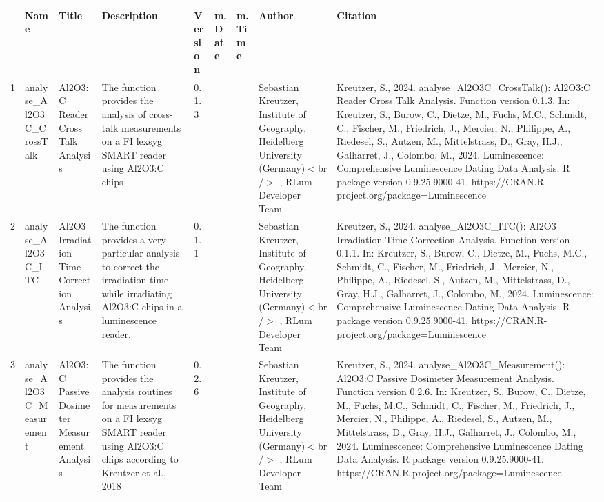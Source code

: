 \begin{table}[ht]
\centering
\begin{tabular}{rllllllll}
  \hline
 & Name & Title & Description & Version & m.Date & m.Time & Author & Citation \\ 
  \hline
1 & analyse\_Al2O3C\_CrossTalk & Al2O3:C Reader Cross Talk Analysis & The function provides the analysis of cross-talk measurements on a FI lexsyg SMART reader using Al2O3:C chips & 0.1.3
 &  &  & Sebastian Kreutzer, Institute of Geography, Heidelberg University (Germany)$<$br /$>$ , RLum Developer Team & Kreutzer, S., 2024. analyse\_Al2O3C\_CrossTalk(): Al2O3:C Reader Cross Talk Analysis. Function version 0.1.3. In: Kreutzer, S., Burow, C., Dietze, M., Fuchs, M.C., Schmidt, C., Fischer, M., Friedrich, J., Mercier, N., Philippe, A., Riedesel, S., Autzen, M., Mittelstrass, D., Gray, H.J., Galharret, J., Colombo, M., 2024. Luminescence: Comprehensive Luminescence Dating Data Analysis. R package version 0.9.25.9000-41. https://CRAN.R-project.org/package=Luminescence
 \\ 
  2 & analyse\_Al2O3C\_ITC & Al2O3 Irradiation Time Correction Analysis & The function provides a very particular analysis to correct the irradiation time while irradiating Al2O3:C chips in a luminescence reader. & 0.1.1
 &  &  & Sebastian Kreutzer, Institute of Geography, Heidelberg University (Germany)$<$br /$>$ , RLum Developer Team & Kreutzer, S., 2024. analyse\_Al2O3C\_ITC(): Al2O3 Irradiation Time Correction Analysis. Function version 0.1.1. In: Kreutzer, S., Burow, C., Dietze, M., Fuchs, M.C., Schmidt, C., Fischer, M., Friedrich, J., Mercier, N., Philippe, A., Riedesel, S., Autzen, M., Mittelstrass, D., Gray, H.J., Galharret, J., Colombo, M., 2024. Luminescence: Comprehensive Luminescence Dating Data Analysis. R package version 0.9.25.9000-41. https://CRAN.R-project.org/package=Luminescence
 \\ 
  3 & analyse\_Al2O3C\_Measurement & Al2O3:C Passive Dosimeter Measurement Analysis & The function provides the analysis routines for measurements on a FI lexsyg SMART reader using Al2O3:C chips according to Kreutzer et al., 2018 & 0.2.6
 &  &  & Sebastian Kreutzer, Institute of Geography, Heidelberg University (Germany)$<$br /$>$ , RLum Developer Team & Kreutzer, S., 2024. analyse\_Al2O3C\_Measurement(): Al2O3:C Passive Dosimeter Measurement Analysis. Function version 0.2.6. In: Kreutzer, S., Burow, C., Dietze, M., Fuchs, M.C., Schmidt, C., Fischer, M., Friedrich, J., Mercier, N., Philippe, A., Riedesel, S., Autzen, M., Mittelstrass, D., Gray, H.J., Galharret, J., Colombo, M., 2024. Luminescence: Comprehensive Luminescence Dating Data Analysis. R package version 0.9.25.9000-41. https://CRAN.R-project.org/package=Luminescence

\end{tabular}
\end{table}
